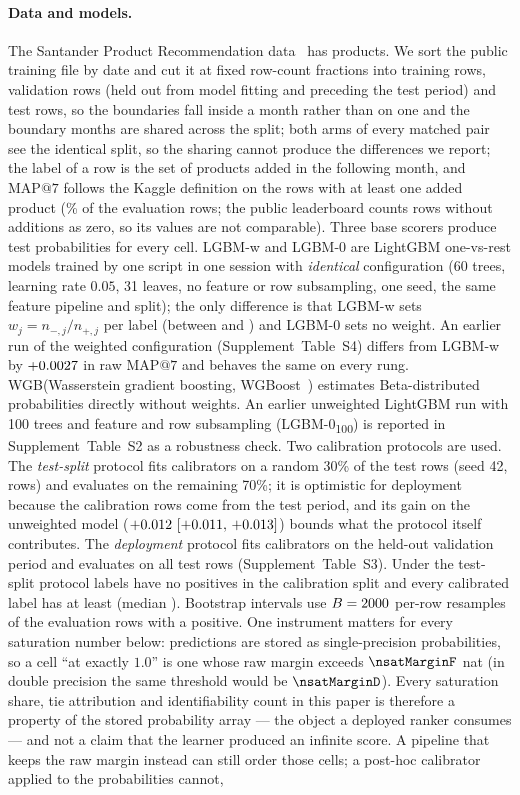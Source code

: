 \documentclass[sigconf,nonacm]{acmart}
\makeatletter
\newcommand{\Sm}{\textsf{LGBM-w}\xspace}
\newcommand{\Wm}{\textsf{WGB}\xspace}
\newcommand{\Nm}{\textsf{LGBM-0}\xspace}
\newcommand{\Nhm}{\textsf{LGBM-0\textsubscript{100}}\xspace}
\newcommand{\mapseven}{\mathrm{MAP}@7\xspace}
\newcommand{\Supp}[1]{Supplement~#1}  %
\makeatother
\begin{document}
\paragraph{Data and models.} The Santander Product Recommendation data~\cite{KaggleSantander2016} has \nnLabels{} products. We sort the public training file by date and cut it at fixed row-count fractions into \nnTrain{} training rows, \nnValRows{} validation rows (held out from model fitting and preceding the test period) and \nnTest{} test rows, so the boundaries fall inside a month rather than on one and the boundary months are shared across the split; both arms of every matched pair see the identical split, so the sharing cannot produce the differences we report; the label of a row is the set of products added in the following month, and $\mapseven$ follows the Kaggle definition on the rows with at least one added product (\nfracRowsWithPos\% of the \nnEvalRows{} evaluation rows; the public leaderboard counts rows without additions as zero, so its values are not comparable). Three base scorers produce test probabilities for every cell. \Sm and \Nm are LightGBM one-vs-rest models trained by one script in one session with \emph{identical} configuration (60 trees, learning rate $0.05$, 31 leaves, no feature or row subsampling, one seed, the same feature pipeline and split); the only difference is that \Sm sets $w_j=n_{-,j}/n_{+,j}$ per label (between \nwMin{} and \nwMax) and \Nm sets no weight. An earlier run of the weighted configuration (\Supp{Table~S4}) differs from \Sm by $+0.0027$ in raw $\mapseven$ and behaves the same on every rung. \Wm (Wasserstein gradient boosting, WGBoost~\cite{Matsubara2024WGBoost}) estimates Beta-distributed probabilities directly without weights. An earlier unweighted LightGBM run with 100 trees and feature and row subsampling (\Nhm) is reported in \Supp{Table~S2} as a robustness check. Two calibration protocols are used. The \emph{test-split} protocol fits calibrators on a random 30\% of the test rows (seed 42, \nnVal{} rows) and evaluates on the remaining 70\%; it is optimistic for deployment because the calibration rows come from the test period, and its gain on the unweighted model ($+0.012~[+0.011,\,+0.013]$) bounds what the protocol itself contributes. The \emph{deployment} protocol fits calibrators on the held-out validation period and evaluates on all test rows (\Supp{Table~S3}). Under the test-split protocol \nSnDead{} labels have no positives in the calibration split and every calibrated label has at least \ncalPosMinAlive{} (median \ncalPosMedAlive). Bootstrap intervals use $B=2000$ per-row resamples of the \nbootN{} evaluation rows with a positive. One instrument matters for every saturation number below: predictions are stored as single-precision probabilities, so a cell ``at exactly $1.0$'' is one whose raw margin exceeds $\nsatMarginF$ nat (in double precision the same threshold would be $\nsatMarginD$). Every saturation share, tie attribution and identifiability count in this paper is therefore a property of the stored probability array --- the object a deployed ranker consumes --- and not a claim that the learner produced an infinite score. A pipeline that keeps the raw margin instead can still order those cells; a post-hoc calibrator applied to the probabilities cannot, 
\end{document}

